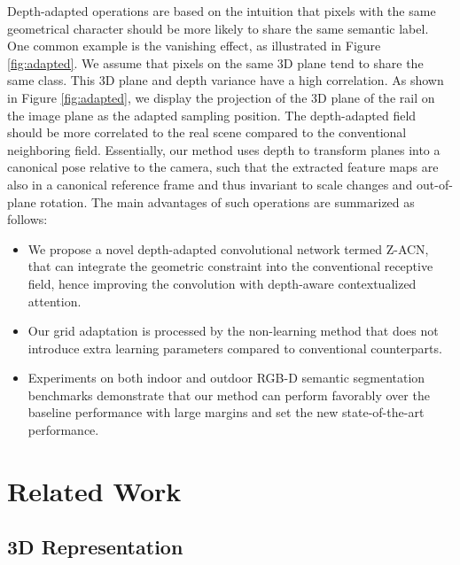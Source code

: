 \documentclass[lettersize,journal]{IEEEtran}
\begin{document}
Depth-adapted operations are based on the intuition that pixels with the same geometrical character should be more likely to share the same semantic label. One common example is the vanishing effect, as illustrated in Figure \ref{fig:adapted}. We assume that pixels on the same 3D plane tend to share the same class. This 3D plane and depth variance have a high correlation. As shown in Figure \ref{fig:adapted}, we display the projection of the 3D plane of the rail on the image plane as the adapted sampling position. The depth-adapted field should be more correlated to the real scene compared to the conventional neighboring field. Essentially, our method uses depth to transform planes into a canonical pose relative to the camera, such that the extracted feature maps are also in a canonical reference frame and thus invariant to scale changes and out-of-plane rotation. The main advantages of such operations are summarized as follows:


\begin{itemize}
    \item We propose a novel depth-adapted convolutional network termed Z-ACN, that can integrate the geometric constraint into the conventional receptive field, hence improving the convolution with depth-aware contextualized attention.
    \item Our grid adaptation is processed by the non-learning method that does not introduce extra learning parameters compared to conventional counterparts.
    \item Experiments on both indoor and outdoor RGB-D semantic segmentation benchmarks demonstrate that our method can perform favorably over the baseline performance with large margins and set the new state-of-the-art performance.
\end{itemize}





\section{Related Work}

\subsection{3D Representation}
\end{document}
